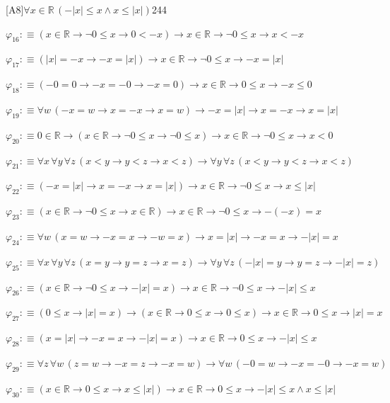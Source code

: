 \begin{fullproof}{[A8]}{$\forall x \in \mathbb{R}\,(-\lvert x \rvert \leq x \land x \leq \lvert x \rvert)$}{244}
\begin{abbrevlist}
\item $\varphi_{16} :\equiv (x \in \mathbb{R} \to \neg 0 \leq x \to 0 < -x) \to x \in \mathbb{R} \to \neg 0 \leq x \to x < -x$
\item $\varphi_{17} :\equiv (\lvert x \rvert = -x \to -x = \lvert x \rvert) \to x \in \mathbb{R} \to \neg 0 \leq x \to -x = \lvert x \rvert$
\item $\varphi_{18} :\equiv (-0 = 0 \to -x = -0 \to -x = 0) \to x \in \mathbb{R} \to 0 \leq x \to -x \leq 0$
\item $\varphi_{19} :\equiv \forall w\,(-x = w \to x = -x \to x = w) \to -x = \lvert x \rvert \to x = -x \to x = \lvert x \rvert$
\item $\varphi_{20} :\equiv 0 \in \mathbb{R} \to (x \in \mathbb{R} \to \neg 0 \leq x \to \neg 0 \leq x) \to x \in \mathbb{R} \to \neg 0 \leq x \to x < 0$
\item $\varphi_{21} :\equiv \forall x\,\forall y\,\forall z\,(x < y \to y < z \to x < z) \to \forall y\,\forall z\,(x < y \to y < z \to x < z)$
\item $\varphi_{22} :\equiv (-x = \lvert x \rvert \to x = -x \to x = \lvert x \rvert) \to x \in \mathbb{R} \to \neg 0 \leq x \to x \leq \lvert x \rvert$
\item $\varphi_{23} :\equiv (x \in \mathbb{R} \to \neg 0 \leq x \to x \in \mathbb{R}) \to x \in \mathbb{R} \to \neg 0 \leq x \to -(-x) = x$
\item $\varphi_{24} :\equiv \forall w\,(x = w \to -x = x \to -w = x) \to x = \lvert x \rvert \to -x = x \to -\lvert x \rvert = x$
\item $\varphi_{25} :\equiv \forall x\,\forall y\,\forall z\,(x = y \to y = z \to x = z) \to \forall y\,\forall z\,(-\lvert x \rvert = y \to y = z \to -\lvert x \rvert = z)$
\item $\varphi_{26} :\equiv (x \in \mathbb{R} \to \neg 0 \leq x \to -\lvert x \rvert = x) \to x \in \mathbb{R} \to \neg 0 \leq x \to -\lvert x \rvert \leq x$
\item $\varphi_{27} :\equiv (0 \leq x \to \lvert x \rvert = x) \to (x \in \mathbb{R} \to 0 \leq x \to 0 \leq x) \to x \in \mathbb{R} \to 0 \leq x \to \lvert x \rvert = x$
\item $\varphi_{28} :\equiv (x = \lvert x \rvert \to -x = x \to -\lvert x \rvert = x) \to x \in \mathbb{R} \to 0 \leq x \to -\lvert x \rvert \leq x$
\item $\varphi_{29} :\equiv \forall z\,\forall w\,(z = w \to -x = z \to -x = w) \to \forall w\,(-0 = w \to -x = -0 \to -x = w)$
\item $\varphi_{30} :\equiv (x \in \mathbb{R} \to 0 \leq x \to x \leq \lvert x \rvert) \to x \in \mathbb{R} \to 0 \leq x \to -\lvert x \rvert \leq x \land x \leq \lvert x \rvert$

\end{abbrevlist}
\end{fullproof}
